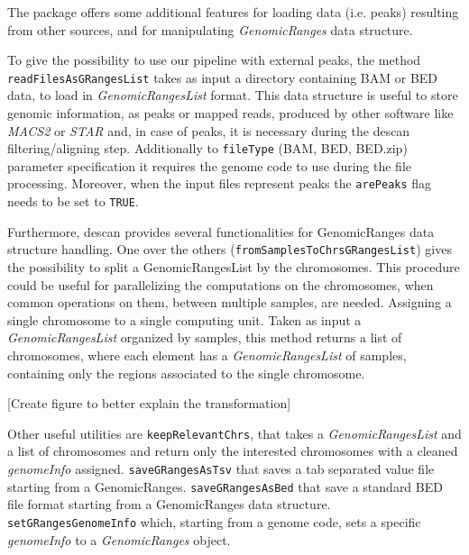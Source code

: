 The package offers some additional features for loading data (i.e. peaks) resulting from other sources, and for manipulating \textit{GenomicRanges} data structure.

To give the possibility to use our pipeline with external peaks, the method \lstinline{readFilesAsGRangesList} takes as input a directory containing BAM or BED data, to load in \textit{GenomicRangesList} format.
This data structure is useful to store genomic information, as peaks or mapped reads, produced by other software like \textit{MACS2} or \textit{STAR} and, in case of peaks, it is necessary during the \gls{descan} filtering/aligning step.
Additionally to \lstinline{fileType} (BAM, BED, BED.zip) parameter specification it requires the genome code to use during the file processing.
Moreover, when the input files represent peaks the \lstinline{arePeaks} flag needs to be set to \lstinline{TRUE}.

Furthermore, \gls{descan} provides several functionalities for GenomicRanges data structure
handling. One over the others (\lstinline{fromSamplesToChrsGRangesList}) gives the possibility to split a GenomicRangesList by the chromosomes. 
This procedure could be useful for parallelizing the computations on the chromosomes, when common operations on them, between multiple samples, are needed. Assigning a single chromosome to a single computing unit.
Taken as input a \textit{GenomicRangesList} organized by samples, this method returns a list of chromosomes, where each element has a \textit{GenomicRangesList} of samples, containing only the regions associated to the single chromosome.

[Create figure to better explain the transformation]

Other useful utilities are \lstinline{keepRelevantChrs}, that takes a \textit{GenomicRangesList} and a list of chromosomes and return only the interested chromosomes with a cleaned \textit{genomeInfo} assigned.
\lstinline{saveGRangesAsTsv} that saves a tab separated value file starting from a GenomicRanges.
\lstinline{saveGRangesAsBed} that save a standard BED file format starting from a GenomicRanges data structure.
\lstinline{setGRangesGenomeInfo} which, starting from a genome code, sets a specific \textit{genomeInfo} to a \textit{GenomicRanges} object.
